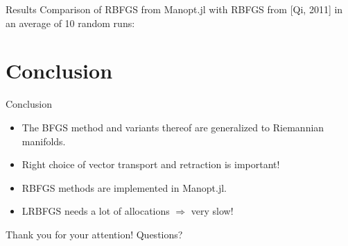\documentclass[9pt]{beamer}
\begin{document}
\begin{frame}{Results}
    Comparison of RBFGS from Manopt.jl with RBFGS from [Qi, 2011] in an average of 10 random runs:
    \begin{table}[H]
    \end{table}
\end{frame}

\section{Conclusion}

\begin{frame}{Conclusion}
    \begin{itemize}
        \item The BFGS method and variants thereof are generalized to Riemannian manifolds.
        \item Right choice of vector transport and retraction is important!
        \item RBFGS methods are implemented in Manopt.jl.
        \item LRBFGS needs a lot of allocations $\Rightarrow$ very slow!
    \end{itemize}
    \begin{center}
        Thank you for your attention! Questions? 
    \end{center}
\end{frame}
\end{document}
